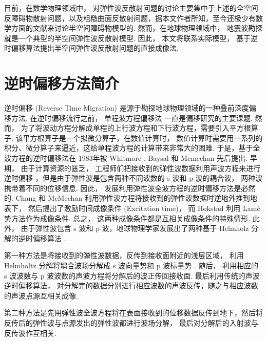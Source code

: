 目前，在数学物理领域中， 对弹性波反散射问题的讨论主要集中于上述的全空间反障碍物散射问题，以及粗糙曲面反散射问题\cite{hu2016factorization,li2016near,liu2019near,hu2018direct}，据本文作者所知，至今还极少有数学方面的文献来讨论半空间障碍物模型的.  然而，在地球物理领域中， 地震波勘探就是一个典型的半空间弹性波反散射模型.  因此， 本文将联系实际模型， 基于逆时偏移算法提出半空间弹性波反散射问题的直接成像法. 



\section{逆时偏移方法简介}

逆时偏移 (Reverse Time Migration) 是源于勘探地球物理领域的一种叠前深度偏移方法.  在逆时偏移流行之前， 单程波方程偏移法\cite{claerbout1972downward,gazdag1978wave} 一直是偏移研究的主要课题. 然而， 为了将波动方程分解成单程的上行波方程和下行波方程，需要引入平方根算子\cite{zhanggq1993,Zhang2007,zhang2018itoin}.  该平方根算子是一个拟微分算子，在数值计算时， 数值计算时需要用一系列的积分、微分算子来逼近，这给单程波方程的计算带来非常大的困难. 于是，基于全波方程的逆时偏移法在 1983年被 Whitmore \cite{whitmore1983iterative}, Baysal \cite{baysal1983reverse} 和 Mcmechan  \cite{mcmechan1983migration} 先后提出.  早期， 由于计算资源的匮乏， 工程师们把接收到的弹性波数据利用声波方程来进行逆时偏移 \cite{zhang2009,Zhang08,bleistein2013mathematics,claerbout1985imaging,berkhout2012seismic}，但是由于弹性波是包含两种不同波数的 s 波和 p 波的耦合波， 两种波携带着不同的位移信息\cite{yan2008isotropic}.  因此， 发展利用弹性波全波方程的逆时偏移方法是必然的. Chang 和 McMechan \cite{chang1986reverse} 利用弹性波方程将接收到的弹性波数据时逆地外推到地表下， 然后提出了激励时间成像条件 (Excitation time)， 而 Hokstad\cite{hokstad1998elastic} 利用 {Lam\'{e}} 势方法作为成像条件.  总之， 这两种成像条件都是互相关成像条件的特殊情形\cite{yan2008isotropic}. 此外， 由于弹性波包含 s 波和 p 波，地球物理学家发展出了两种基于 Helmholz 分解的逆时偏移算法 \cite{yan2008isotropic,sun2001scalar,denli2008elastic,chung2012implementation}.  

第一种方法是将接收到的弹性波数据，反传到接收面附近的浅层区域， 利用 Helmholtz 分解将耦合波场分解成 s 波向量势和 p 波标量势 \cite{etgen1988prestacked,zhe1997prestack}. 随后， 利用相应的 s 波波数与 p 波波数的声波方程将分解后的波正传回接收面. 最后利用传统的声波逆时偏移算法， 对分解完的数据分别进行相应波数的声波反传，随之与相应波数的声波点源互相关成像. 

第二种方法是先用弹性波全波方程将在表面接收到的位移数据反传到地下，然后将反传后的弹性波与点源发出的弹性波都进行波场分解， 最后对分解后的入射波与反传波作互相关\cite{dellinger1990wave}. 
 
